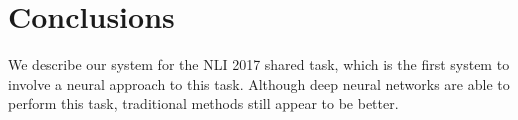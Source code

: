 \documentclass[11pt,letterpaper]{article}
\begin{document}
\section{Conclusions}
We describe our system for the NLI 2017 shared task, which is the first system to involve a neural approach to this task.
Although deep neural networks are able to perform this task, traditional methods still appear to be better.




\end{document}

